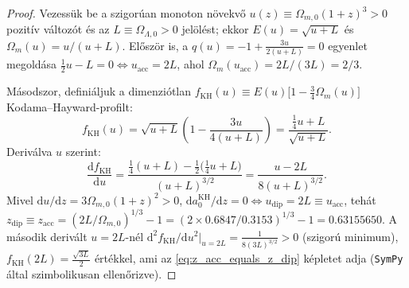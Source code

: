 \documentclass[11pt,a4paper]{article}
\theoremstyle{remark}
\begin{document}
\begin{proof}
Vezess\"uk be a szigor\'uan monoton n\"ovekv\H{o} $u(z) \equiv \Omega_{m,0}(1+z)^3 > 0$ pozit\'iv v\'altoz\'ot \'es az $L \equiv \Omega_{\Lambda,0} > 0$ jel\"ol\'est; ekkor $E(u) = \sqrt{u + L}$ \'es $\Omega_m(u) = u/(u + L)$. El\H{o}sz\"or is, a $q(u) = -1 + \frac{3u}{2(u + L)} = 0$ egyenlet megold\'asa $\frac{1}{2}u - L = 0 \iff u_{\mathrm{acc}} = 2L$, ahol $\Omega_m(u_{\mathrm{acc}}) = 2L/(3L) = 2/3$.

M\'asodszor, defini\'aljuk a dimenzi\'otlan $f_{\mathrm{KH}}(u) \equiv E(u)\bigl[1 - \frac{3}{4}\Omega_m(u)\bigr]$ Kodama--Hayward-profilt:
\[
  f_{\mathrm{KH}}(u) = \sqrt{u + L}\left(1 - \frac{3u}{4(u + L)}\right) = \frac{\frac{1}{4}u + L}{\sqrt{u + L}}.
\]
Deriv\'alva $u$ szerint:
\[
  \frac{\mathrm{d}f_{\mathrm{KH}}}{\mathrm{d}u} = \frac{\frac{1}{4}(u + L) - \frac{1}{2}\bigl(\frac{1}{4}u + L\bigr)}{(u + L)^{3/2}} = \frac{u - 2L}{8(u + L)^{3/2}}.
\]
Mivel $\mathrm{d}u/\mathrm{d}z = 3\Omega_{m,0}(1+z)^2 > 0$, $\mathrm{d}a_0^{\mathrm{KH}}/\mathrm{d}z = 0 \iff u_{\mathrm{dip}} = 2L \equiv u_{\mathrm{acc}}$, teh\'at $z_{\mathrm{dip}} \equiv z_{\mathrm{acc}} = (2L/\Omega_{m,0})^{1/3} - 1 = (2 \times 0.6847 / 0.3153)^{1/3} - 1 = 0.63155650$. A m\'asodik deriv\'alt $u = 2L$-n\'el $\mathrm{d}^2 f_{\mathrm{KH}}/\mathrm{d}u^2|_{u=2L} = \frac{1}{8(3L)^{3/2}} > 0$ (szigor\'u minimum), $f_{\mathrm{KH}}(2L) = \frac{\sqrt{3L}}{2}$ \'ert\'ekkel, ami az \eqref{eq:z_acc_equals_z_dip} k\'epletet adja (\texttt{SymPy} \'altal szimbolikusan ellen\H{o}rizve).
\end{proof}
\end{document}
